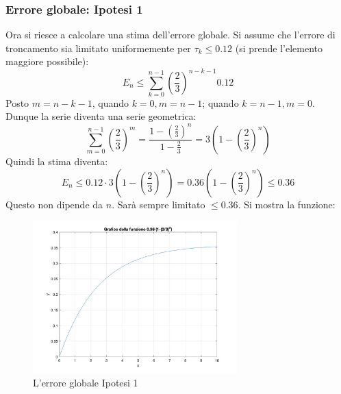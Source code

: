 \documentclass[11pt]{article}
\begin{document}
\subsubsection{Errore globale: Ipotesi 1} 
Ora si riesce a calcolare una stima dell'errore globale. Si assume che l'errore di troncamento sia limitato uniformemente per $\tau_k\leq 0.12$ (si prende l'elemento maggiore possibile):
\[
E_n\leq\sum^{n-1}_{k=0}\left(\frac{2}{3} \right)^{n-k-1}0.12
\]
Posto $m=n-k-1$, quando $k=0,m=n-1$; quando $k=n-1, m=0$. Dunque la serie diventa una serie geometrica:
\[
\sum^{n-1}_{m=0}\left( \frac{2}{3} \right) ^{m}=\frac{1-\left( \frac{2}{3} \right) ^n}{1-\frac{2}{3}}=3 \left( 1- \left( \frac{2}{3} \right)^n \right)
\]
Quindi la stima diventa:
\[
E_n\leq0.12\cdot3 \left( 1- \left( \frac{2}{3} \right)^n \right)=0.36 \left( 1- \left( \frac{2}{3} \right)^n \right)\leq0.36
\]
Questo non dipende da $n$. Sarà sempre limitato $\leq0.36$. Si mostra la funzione:
\begin{figure}[H]
  \centering
  \includegraphics[width=0.7\textwidth]{images/fig3.jpg} 
  \caption{L'errore globale Ipotesi 1}
  \label{fig:funzione}
\end{figure}
\end{document}
